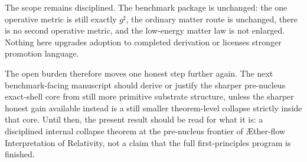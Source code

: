 \documentclass[11pt]{article}
\newcommand{\Aflow}{\AE{}ther-flow}
\newcommand{\TheoryName}{\Aflow{} Interpretation of Relativity}
\newcommand{\CompletedMetric}{g^{\sharp}}
\begin{document}
The scope remains disciplined. The benchmark package is unchanged: the one operative metric is still exactly \(\CompletedMetric\), the ordinary matter route is unchanged, there is no second operative metric, and the low-energy matter law is not enlarged. Nothing here upgrades adoption to completed derivation or licenses stronger promotion language.

The open burden therefore moves one honest step further again. The next benchmark-facing manuscript should derive or justify the sharper pre-nucleus exact-shell core from still more primitive substrate structure, unless the sharper honest gain available instead is a still smaller theorem-level collapse strictly inside that core. Until then, the present result should be read for what it is: a disciplined internal collapse theorem at the pre-nucleus frontier of \TheoryName{}, not a claim that the full first-principles program is finished.
\end{document}
